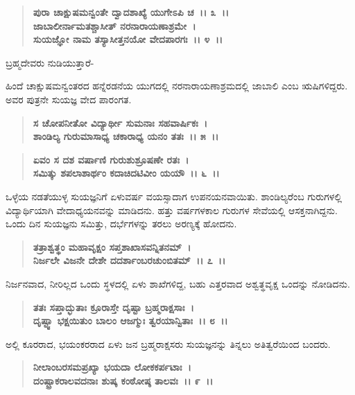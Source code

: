 \begin{verse}
\textbf{ಪುರಾ ಚಾಕ್ಷುಷಮನ್ವಂತೇ ದ್ವಾದಶಾಖ್ಯೆ ಯುಗೇಽಪಿ ಚ~।। ೩~।।}\\\textbf{ಜಾಬಾಲೀರ್ನಾಮತಶ್ಚಾಸೀತ್ ನರನಾರಾಯಣಾಶ್ರಮೇ~।}\\\textbf{ಸುಯಜ್ಞೋ ನಾಮ ತಸ್ಯಾಸೀತ್ತನಯೋ ವೇದಪಾರಗಃ~।। ೪~।।}
\end{verse}

\begin{flushleft}
ಬ್ರಹ್ಮದೇವರು ನುಡಿಯುತ್ತಾರೆ-
\end{flushleft}

ಹಿಂದೆ ಚಾಕ್ಷುಷಮನ್ವಂತರದ ಹನ್ನೆರಡನೆಯ ಯುಗದಲ್ಲಿ ನರನಾರಾಯಣಾಶ್ರಮದಲ್ಲಿ ಜಾಬಾಲಿ ಎಂಬ ಋಷಿಗಳಿದ್ದರು. ಅವರ ಪುತ್ರನೇ ಸುಯಜ್ಞ ವೇದ ಪಾರಂಗತ.

\begin{verse}
\textbf{ಸ ಚೋಪನೀತೋ ವಿದ್ಯಾರ್ಥೀ ಸುಮನಾಃ ಸಹವಾರ್ಷಿಕಃ~।}\\\textbf{ಶಾಂಡಿಲ್ಯ ಗುರುಮಾಸಾಧ್ಯ ಚಕಾರಾಧ್ಯ ಯನಂ ತತಃ~।। ೫~।। }
\end{verse}

\begin{verse}
\textbf{ಏವಂ ಸ ದಶ ವರ್ಷಾಣಿ ಗುರುಶುಶ್ರೂಷಣೇ ರತಃ~।}\\\textbf{ಸಮಿತ್ಕು ಶಪಲಾಶಾರ್ಥಂ ಕದಾಚಿದಟಿವೀಂ ಯಯೌ~।। ೬~।।}
\end{verse}

ಒಳ್ಳೆಯ ನಡತೆಯುಳ್ಳ ಸುಯಜ್ಞನಿಗೆ ಏಳುವರ್ಷ ವಯಸ್ಸಾದಾಗ ಉಪನಯನ\-ವಾಯಿತು. ಶಾಂಡಿಲ್ಯರೆಂಬ ಗುರುಗಳಲ್ಲಿ ವಿದ್ಯಾರ್ಥಿಯಾಗಿ ವೇದಾಧ್ಯಯನವನ್ನು ಮಾಡಿದನು. ಹತ್ತು ವರ್ಷಗಳಕಾಲ ಗುರುಗಳ ಸೇವೆಯಲ್ಲಿ ಆಸಕ್ತನಾಗಿದ್ದನು. ಒಂದು ದಿನ ಸುಯಜ್ಞನು ಸಮಿತ್ತು, ದರ್ಭೆಗಳನ್ನು ತರಲು ಅರಣ್ಯಕ್ಕೆ ಹೋದನು.

\begin{verse}
\textbf{ತತ್ರಾಶ್ವತ್ಥಂ ಮಹಾವೃಕ್ಷಂ ಸಪ್ತಶಾಖಾಸವನ್ನಿತನಮ್~।}\\\textbf{ನಿರ್ಜಲೇ ವಿಜನೇ ದೇಶೇ ದದರ್ಶಾಂಬರಚುಂಬಿತಮ್~।। ೭~।।}
\end{verse}

ನಿರ್ಜನವಾದ, ನೀರಿಲ್ಲದ ಒಂದು ಸ್ಥಳದಲ್ಲಿ ಏಳು ಶಾಖೆಗಳಿದ್ದ, ಬಹು ಎತ್ತರವಾದ ಅಶ್ವತ್ಥವೃಕ್ಷ ಒಂದನ್ನು ನೋಡಿದನು.

\begin{verse}
\textbf{ತತಃ ಸಪ್ತಾದ್ಭುತಾಃ ಕ್ರೂರಾಸ್ತೇ ದೃಷ್ಟಾ ಬ್ರಹ್ಮರಾಕ್ಷಸಾಃ~।}\\\textbf{ದೃಷ್ಟ್ವಾ ಭಕ್ಷಯಿತುಂ ಬಾಲಂ ಆಜಗ್ಮುಃ ತ್ವರಯಾನ್ವಿತಾಃ~।। ೮~।।}
\end{verse}

ಅಲ್ಲಿ ಕೂರರಾದ, ಭಯಂಕರರಾದ ಏಳು ಜನ ಬ್ರಹ್ಮರಾಕ್ಷಸರು ಸುಯಜ್ಞನನ್ನು ತಿನ್ನಲು ಅತಿತ್ವರೆಯಿಂದ ಬಂದರು.

\begin{verse}
\textbf{ನೀಲಾಂಬರಸಮಪ್ರಖ್ಯಾ ಭಯದಾ ಲೋಕಕರ್ಪಟಾಃ~।}\\\textbf{ದಂಷ್ಟ್ರಾಕರಾಲವದನಾಃ ಶುಷ್ಕ ಕಂಠೋಷ್ಠ ತಾಲವಃ~।। ೯~।।} 
\end{verse}

